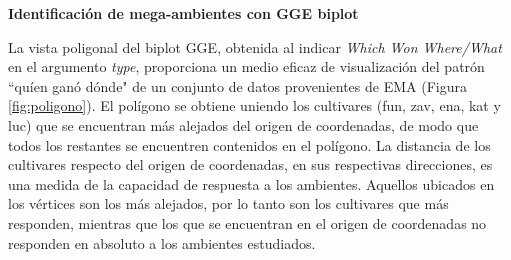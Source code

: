 

\textbf{Identificación de mega-ambientes con GGE biplot}

La vista poligonal del biplot GGE, obtenida al indicar \emph{Which Won Where/What} en el argumento \emph{type}, proporciona un medio eficaz de visualización del patrón ``quíen ganó dónde"  de un conjunto de datos provenientes de EMA (Figura \ref{fig:poligono}).  El polígono se obtiene uniendo los cultivares (fun, zav, ena, kat y luc) que se encuentran más alejados del origen de coordenadas, de modo que todos los restantes se encuentren contenidos en el polígono. La distancia de los cultivares respecto del origen de coordenadas, en sus respectivas direcciones, es una medida de la capacidad de respuesta a los ambientes. Aquellos ubicados en los vértices son los más alejados, por lo tanto son los cultivares que más responden, mientras que los que se encuentran en el origen de coordenadas no responden en absoluto a los ambientes estudiados.

